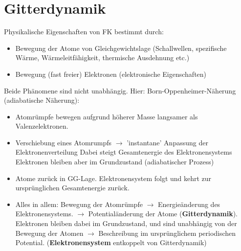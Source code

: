 \section{Gitterdynamik} \label{kap:4}
Physikalische Eigenschaften von FK bestimmt durch:
\begin{itemize}
	\item Bewegung der Atome von Gleichgewichtslage
	(Schallwellen, spezifische Wärme, Wärmeleitfähigkeit, thermische Ausdehnung etc.)
	\item Bewegung (fast freier) Elektronen (elektronische Eigenschaften)
\end{itemize}
Beide Phänomene sind nicht unabhängig. Hier: Born-Oppenheimer-Näherung (adiabatische Näherung):
\begin{itemize}
	\item Atomrümpfe bewegen aufgrund höherer Masse langsamer als Valenzelektronen.
	\item Verschiebung eines Atomrumpfs $\rightarrow$ 'instantane' Anpassung der Elektronenverteilung
	Dabei steigt Gesamtenergie des Elektronensystems Elektronen bleiben aber im Grundzustand (adiabatischer Prozess)
	\item Atome zurück in GG-Lage. Elektronensystem folgt und kehrt zur ursprünglichen Gesamtenergie zurück.
	\item Alles in allem: Bewegung der Atomrümpfe $\rightarrow$ Energieänderung des Elektronensystems. 
	$\rightarrow$ Potentialänderung der Atome (\textbf{Gitterdynamik}).
	Elektronen bleiben dabei im Grundzustand, und sind unabhängig von der Bewegung der Atomen $\rightarrow$ Beschreibung im
	ursprünglichem periodischen Potential. (\textbf{Elektronensystem} entkoppelt von Gitterdynamik)
\end{itemize}



